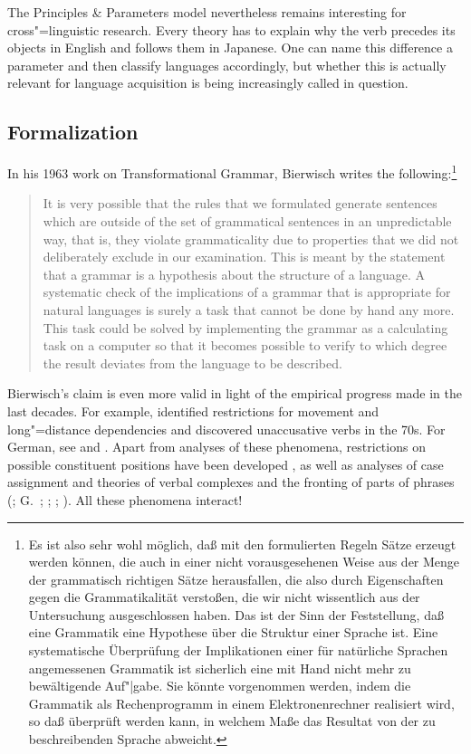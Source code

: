 The Principles \& Parameters model nevertheless remains interesting for cross"=linguistic
research. Every theory has to explain why the verb precedes its objects in English and follows them in 
Japanese. One can name this difference a parameter and then classify languages
accordingly, but whether this is actually relevant for language acquisition is being increasingly called in question.

\subsection{Formalization}
\label{sec-formalization-gb}
\addlines

In his 1963 work on Transformational Grammar, Bierwisch writes the following:\footnote{%
Es ist also sehr wohl möglich, daß mit den formulierten Regeln Sätze erzeugt werden können,
die auch in einer nicht vorausgesehenen Weise aus der Menge der grammatisch richtigen Sätze herausfallen,
die also durch Eigenschaften gegen die Grammatikalität verstoßen, die wir nicht wissentlich aus
der Untersuchung ausgeschlossen haben. Das ist der Sinn der Feststellung, daß eine Grammatik
eine Hypothese über die Struktur einer Sprache ist. Eine systematische Überprüfung der Implikationen
einer für natürliche Sprachen angemessenen Grammatik ist sicherlich eine mit Hand nicht mehr
zu bewältigende Auf"|gabe. Sie könnte vorgenommen werden, indem die Grammatik als Rechenprogramm in einem
Elektronenrechner realisiert wird, so daß überprüft werden kann, in welchem Maße das Resultat
von der zu beschreibenden Sprache abweicht.}
\begin{quote}
It is very possible that the rules that we formulated generate
sentences which are outside of the set of grammatical sentences in an
unpredictable way, that is, they violate grammaticality due to
properties that we did not deliberately exclude in our examination. This
is meant by the statement that a grammar is a hypothesis about the
structure of a language. A systematic check of the implications of a
grammar that is appropriate for natural languages is surely a task that
cannot be done by hand any more. This task could be solved by
implementing the grammar as a calculating task on a computer so that it
becomes possible to verify to which degree the result deviates from the
language to be described. \citep*[]{Bierwisch63}
\end{quote}
Bierwisch's claim is even more valid in light of the empirical progress made in the last decades. For example,
\citet{Ross67} identified restrictions for movement and long"=distance dependencies and \citet{Perlmutter78} discovered
unaccusative verbs in the 70s. For German, see  and .
Apart from analyses of these phenomena, restrictions on possible constituent positions have been developed
\citep{Lenerz77}, as well as analyses of case assignment \citep*{YMJ87,Meurers99b,Prze99} and theories of
verbal complexes and the fronting of parts of phrases  (\citealp{Evers75a,Grewendorf88a,HN94a,Kiss95a}; G.\ \citealp{GMueller98a};
\citealp{Meurers99c}; \citealp{Mueller99a,Mueller2002b}; \citealp{deKuthy2002a}). All these
phenomena interact!

